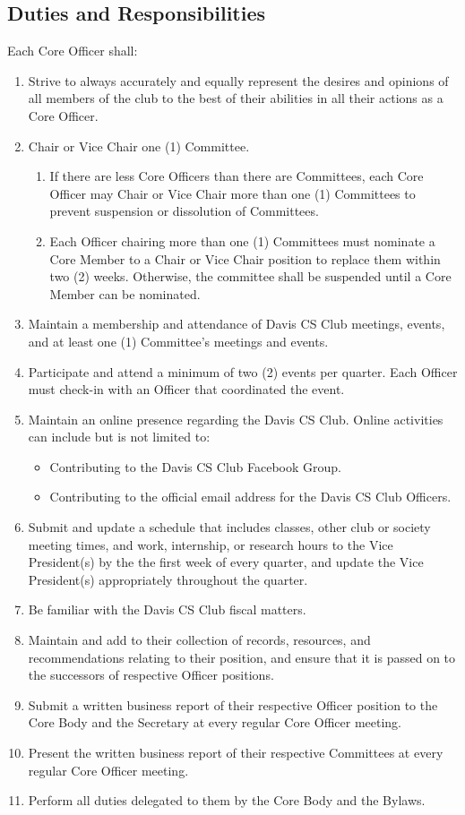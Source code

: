 \documentclass{article}
\newenvironment{li}{
\begin{enumerate}
  \setlength{\itemsep}{1pt}
  \setlength{\parskip}{0pt}
  \setlength{\parsep}{0pt}
}{\end{enumerate}}
\begin{document}
\subsection{Duties and Responsibilities}
Each Core Officer shall:
\begin{li}
\item Strive to always accurately and equally represent the desires and opinions of all members of the club to the best of their abilities in all their actions as a Core Officer.
\item Chair or Vice Chair one (1) Committee.
	\begin{li}
	\item If there are less Core Officers than there are Committees, each Core Officer may Chair or Vice Chair more than one (1) Committees to prevent suspension or dissolution of Committees.
	\item Each Officer chairing more than one (1) Committees must nominate a Core Member to a Chair or Vice Chair position to replace them within two (2) weeks. Otherwise, the committee shall be suspended until a Core Member can be nominated.
	\end{li}
\item Maintain a membership and attendance of Davis CS Club meetings, events, and at least one (1) Committee's meetings and events.
\item Participate and attend a minimum of two (2) events per quarter. Each Officer must check-in with an Officer that coordinated the event.
\item Maintain an online presence regarding the Davis CS Club. Online activities can include but is not limited to:
	\begin{itemize}
	  \setlength{\itemsep}{1pt}
	  \setlength{\parskip}{0pt}
	  \setlength{\parsep}{0pt}
	\item Contributing to the Davis CS Club Facebook Group.
	\item Contributing to the official email address for the Davis CS Club Officers.
	\end{itemize}
\item Submit and update a schedule that includes classes, other club or society meeting times, and work, internship, or research hours to the Vice President(s) by the the first week of every quarter, and update the Vice President(s) appropriately throughout the quarter.
\item Be familiar with the Davis CS Club fiscal matters.
\item Maintain and add to their collection of records, resources, and recommendations relating to their position, and ensure that it is passed on to the successors of respective Officer positions.
\item Submit a written business report of their respective Officer position to the Core Body and the Secretary at every regular Core Officer meeting.
\item Present the written business report of their respective Committees at every regular Core Officer meeting.
\item Perform all duties delegated to them by the Core Body and the Bylaws.
\end{li}
\end{document}
